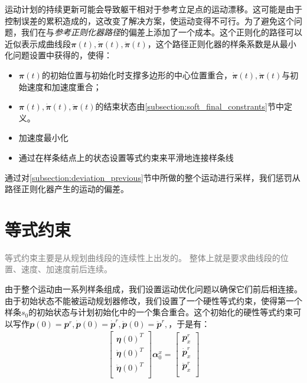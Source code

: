 运动计划的持续更新可能会导致躯干相对于参考立足点的运动漂移。这可能是由于控制误差的累积造成的，这改变了解决方案，使运动变得不可行。为了避免这个问题，我们在与\emph{参考正则化器路径}的偏差上添加了一个成本。这个正则化的路径可以近似表示成曲线段$\mathbfit{\pi}(t),\mathbfit{\dot \pi}(t), \mathbfit{\ddot \pi}(t)$，这个路径正则化器的样条系数是从最小化问题设置中获得的，使得：
\begin{itemize}
    \item $\mathbfit{\pi}(t)$的初始位置与初始化时支撑多边形的中心位置重合，$\mathbfit{\dot \pi}(t), \mathbfit{\ddot \pi}(t)$与初始速度和加速度重合；
    \item $\mathbfit{\pi}(t),\mathbfit{\dot \pi}(t), \mathbfit{\ddot \pi}(t)$的结束状态由\ref{subsection:soft_final_constrants}节中定义。
    \item 加速度最小化
    \item 通过在样条结点上的状态设置等式约束来平滑地连接样条线
\end{itemize}

通过对\ref{subsection:deviation_previous}节中所做的整个运动进行采样，我们惩罚从路径正则化器产生的运动的偏差。


\section{等式约束}

\textcolor{gray}{等式约束主要是从规划曲线段的连续性上出发的。}
\textcolor{gray}{整体上就是要求曲线段的位置、速度、加速度前后连续。}

由于整个运动由一系列样条组成，我们设置运动优化问题以确保它们前后相连接。由于初始状态不能被运动规划器修改，我们设置了一个硬性等式约束，使得第一个样条$s_0$的初始状态与计划初始化中的一个集合重合。这个初始化的硬性等式约束可以写作$\mathbfit{p}(0)=\mathbfit{p}^r,\mathbfit{\dot p}(0)=\mathbfit{\dot p}^r,\mathbfit{\ddot p}(0)=\mathbfit{\ddot p}^r,$，于是有：
\begin{align}
    \begin{bmatrix}
        \mathbfit{\eta}(0)^T\\
        \mathbfit{\dot \eta}(0)^T\\
        \mathbfit{\ddot \eta}(0)^T\\
    \end{bmatrix} \mathbfit{\alpha}_0^x=
    \begin{bmatrix}
        \mathbfit{p}_x^r\\
        \mathbfit{\dot p}_x^r\\
        \mathbfit{\ddot p}_x^r\\
    \end{bmatrix}
\end{align}

